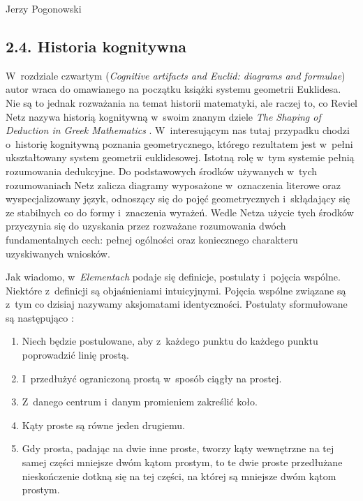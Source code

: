 \begin{newrevplenv}{Jerzy Pogonowski}
\subsection{2.4. Historia kognitywna}

W~rozdziale czwartym ({\em Cognitive artifacts and Euclid:
diagrams and formulae}) autor wraca do omawianego na początku
książki systemu geometrii Euklidesa. Nie są to jednak rozważania
na temat historii matematyki, ale raczej to, co Reviel Netz nazywa
historią kognitywną w~swoim znanym dziele {\em The Shaping of
Deduction in Greek Mathematics} \parencite{netz_shaping_1999}. W~interesującym nas
tutaj przypadku chodzi o~historię kognitywną poznania
geometrycznego, którego rezultatem jest w~pełni ukształtowany
system geometrii euklidesowej. Istotną rolę w~tym systemie pełnią
rozumowania dedukcyjne. Do podstawowych środków używanych w~tych
rozumowaniach Netz zalicza diagramy wyposażone w~oznaczenia
literowe oraz wyspecjalizowany język, odnoszący się do pojęć
geometrycznych i~skłądający się ze stabilnych co do formy i~znaczenia wyrażeń. Wedle Netza użycie tych środków przyczynia się
do uzyskania przez rozważane rozumowania dwóch fundamentalnych
cech: pełnej ogólności oraz koniecznego charakteru uzyskiwanych
wniosków.

Jak wiadomo, w~{\em Elementach} podaje się definicje, postulaty i~pojęcia wspólne. Niektóre z~definicji są objaśnieniami
intuicyjnymi. Pojęcia wspólne związane są z~tym co dzisiaj
nazywamy aksjomatami identyczności. Postulaty sformułowane są
następująco \parencite[s.~275]{euklides_elementy_2013}:

\begin{enumerate}

\item Niech będzie postulowane, aby z~każdego punktu do każdego
punktu poprowadzić linię prostą.

\item I~przedłużyć ograniczoną prostą w~sposób ciągły na prostej.

\item Z~danego centrum i~danym promieniem zakreślić koło.

\item Kąty proste są równe jeden drugiemu.

\item Gdy prosta, padając na dwie inne proste, tworzy kąty
wewnętrzne na tej samej części mniejsze dwóm kątom prostym, to te
dwie proste przedłużane nieskończenie dotkną się na tej części, na
której są mniejsze dwóm kątom prostym.


\end{enumerate}
\end{newrevplenv}
